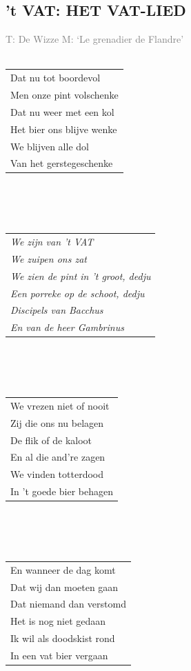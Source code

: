 \documentclass{article}
\begin{document}
\subsection*{'t VAT: HET VAT-LIED}
\textcolor{gray}{T: De Wizze M: ‘Le grenadier de Flandre’}
\\\\
\begin{tabularx}{\textwidth}{>{\raggedright\arraybackslash}X}
Dat nu tot boordevol\\
Men onze pint volschenke\\
Dat nu weer met een kol\\
Het bier ons blijve wenke\\
We blijven alle dol\\
Van het gerstegeschenke\\
\end{tabularx}
\\\\\\
\begin{tabularx}{\textwidth}{>{\raggedright\arraybackslash}X}
    \textit{We zijn van ’t VAT}\\
    \textit{We zuipen ons zat}\\
    \textit{We zien de pint in ’t groot, dedju}\\
    \textit{Een porreke op de schoot, dedju}\\
    \textit{Discipels van Bacchus}\\
    \textit{En van de heer Gambrinus}\\
\end{tabularx}
\\\\\\
\begin{tabularx}{\textwidth}{>{\raggedright\arraybackslash}X}
We vrezen niet of nooit\\
Zij die ons nu belagen\\
De flik of de kaloot\\
En al die and’re zagen\\
We vinden totterdood\\
In ’t goede bier behagen\\
\end{tabularx}
\\\\\\
\begin{tabularx}{\textwidth}{>{\raggedright\arraybackslash}X}
En wanneer de dag komt\\
Dat wij dan moeten gaan\\
Dat niemand dan verstomd\\
Het is nog niet gedaan\\
Ik wil als doodskist rond\\
In een vat bier vergaan \\
\end{tabularx}
\end{document}
